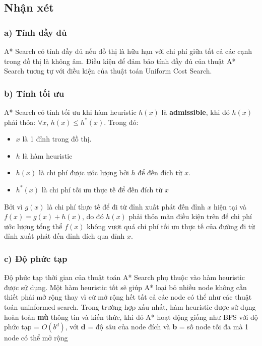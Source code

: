 \subsection{Nhận xét}
\subsubsection{a) Tính đầy đủ}
\hspace{0.42cm} A* Search có tính đầy đủ nếu đồ thị là hữu hạn với chi phí giữa tất cả các cạnh trong đồ thị là không âm. Điều kiện để đảm bảo tính đầy đủ của thuật A* Search tương tự với điều kiện của thuật toán Uniform Cost Search. 
\subsubsection{b) Tính tối ưu}
\hspace{0.42cm} A* Search có tính tối ưu khi hàm heuristic $h(x)$ là \textbf{admissible}, khi đó $h(x)$ phải thỏa: $\forall x$, $ h(x) \leq h^{*}(x)$. Trong đó:
\begin{itemize}
    \item $x$ là 1 đỉnh trong đồ thị.
    \item $h$ là hàm heuristic
    \item $h(x)$ là chi phí được ước lượng bởi $h$ để đến đích từ $x$.
    \item $h^{*}(x)$ là chi phí tối ưu thực tế để đến đích từ $x$
\end{itemize}
Bởi vì $g(x)$ là chi phí thực tế để đi từ đỉnh xuất phát đến đỉnh $x$ hiện tại và $f(x) = g(x) + h(x)$, do đó $h(x)$ phải thỏa mãn điều kiện trên để chi phí ước lượng tổng thể $f(x)$ không vượt quá chi phí tối ưu thực tế của đường đi từ đỉnh xuất phát đến đỉnh đích qua đỉnh $x$.
\subsubsection{c) Độ phức tạp}

\hspace{0.42cm} Độ phức tạp thời gian của thuật toán A{*} Search phụ thuộc vào hàm heuristic được sử dụng. Một hàm heuristic tốt sẽ giúp A{*} loại bỏ nhiều node không cần thiết phải mở rộng thay vì cứ mở rộng hết tất cả các node có thể như các thuật toán uninformed search. Trong trường hợp xấu nhất, hàm heuristic được sử dụng hoàn toàn \textbf{mù} thông tin và kiến thức, khi đó A{*} hoạt động giống như BFS với độ phức tạp = $O(b^d)$, với \textbf{d} = độ sâu của node đích và \textbf{b} = số node tối đa mà 1 node có thể mở rộng

